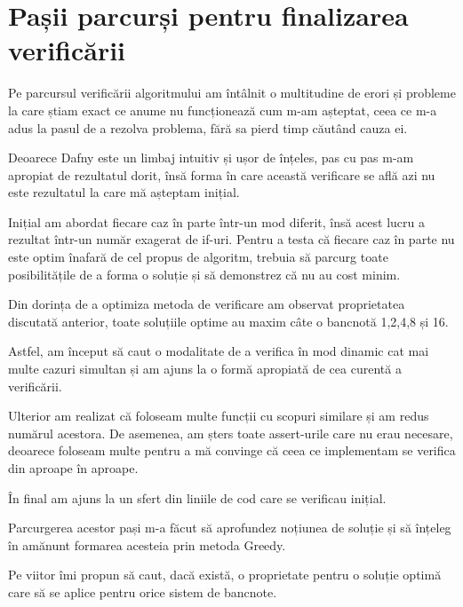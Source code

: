 \chapter*{Pașii parcurși pentru finalizarea verificării} 

Pe parcursul verificării algoritmului am întâlnit o multitudine de erori și probleme la care știam exact ce anume nu 
funcționează cum m-am așteptat, ceea ce m-a adus la pasul de a rezolva problema, fără sa pierd timp căutând cauza ei.\par
Deoarece Dafny este un limbaj intuitiv și ușor de înțeles, pas cu pas m-am apropiat de rezultatul dorit, însă forma în care
această verificare se află azi nu este rezultatul la care mă așteptam inițial.\par
Inițial am abordat fiecare caz în parte într-un mod diferit, însă acest lucru a rezultat  într-un număr exagerat de 
if-uri. Pentru a testa că fiecare caz în parte nu este optim înafară de cel propus de algoritm, trebuia să parcurg
toate posibilitățile de a forma o soluție și să demonstrez că nu au cost minim. \par
Din dorința de a optimiza metoda de verificare am observat proprietatea discutată anterior, toate soluțiile optime
au maxim câte o bancnotă 1,2,4,8 și 16.\par
Astfel, am început să caut o modalitate de a verifica în mod dinamic cat mai multe cazuri simultan și am ajuns la o
formă apropiată de cea curentă a verificării.\par
Ulterior am realizat că foloseam multe funcții cu scopuri similare și am redus numărul acestora.
De asemenea, am șters toate assert-urile care nu erau necesare, deoarece foloseam multe pentru a mă convinge că 
ceea ce implementam se verifica din aproape în aproape.\par
În final am ajuns la un sfert din liniile de cod care se verificau inițial. \par
Parcurgerea acestor pași m-a făcut să aprofundez noțiunea de soluție și să înțeleg în amănunt formarea acesteia prin
metoda Greedy.\par
Pe viitor îmi propun să caut, dacă există, o proprietate pentru o soluție optimă care să se aplice pentru orice sistem de bancnote.
 